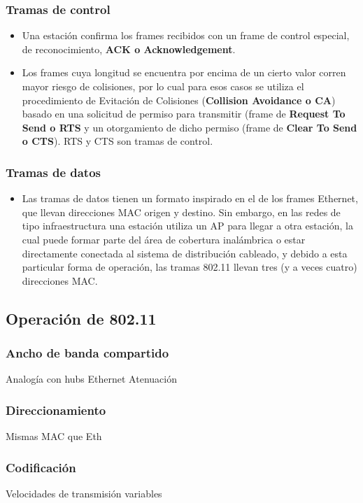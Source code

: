 \subsubsection{Tramas de control}
    \begin{itemize}
        \item Una estación confirma los frames recibidos con un frame de control especial, de reconocimiento, \textbf{ACK o Acknowledgement}. 
        \item Los frames cuya longitud se encuentra por encima de un cierto valor corren mayor riesgo de colisiones, por lo cual para esos casos se utiliza el procedimiento de Evitación de Colisiones (\textbf{Collision Avoidance o CA}) basado en una solicitud de permiso para transmitir (frame de \textbf{Request To Send o RTS} y un otorgamiento de dicho permiso (frame de \textbf{Clear To Send o CTS}). RTS y CTS son tramas de control.
    \end{itemize}  
\subsubsection{Tramas de datos}
    \begin{itemize}  
        \item Las tramas de datos tienen un formato inspirado en el de los frames Ethernet, que llevan direcciones MAC origen y destino. Sin embargo, en las redes de tipo infraestructura una estación utiliza un AP para llegar a otra estación, la cual puede formar parte del área de cobertura inalámbrica o estar directamente conectada al sistema de distribución cableado, y debido a esta particular forma de operación, las tramas 802.11 llevan tres (y a veces cuatro) direcciones MAC. 
    \end{itemize}

\subsection{Operación de 802.11}

\subsubsection{Ancho de banda compartido}
Analogía con hubs Ethernet
Atenuación
\subsubsection{Direccionamiento}
Mismas MAC que Eth
\subsubsection{Codificación}
Velocidades de transmisión variables
